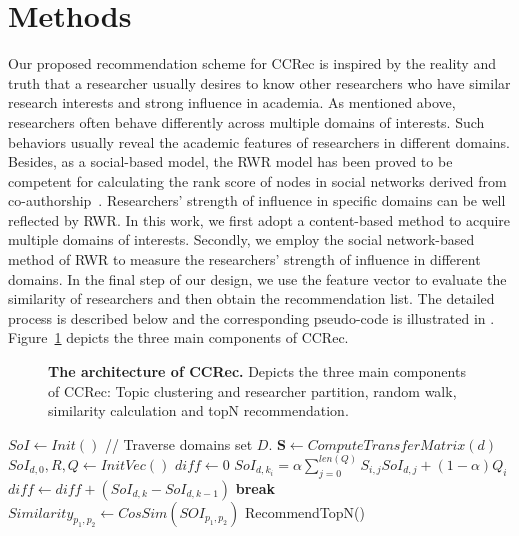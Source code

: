 \documentclass[10pt,letterpaper]{article}
\newcommand{\algorithmicbreak}{\textbf{break}}
\newcommand{\BREAK}{\State \algorithmicbreak}
\begin{document}
\section*{Methods}
Our proposed recommendation scheme for CCRec is inspired by the reality and truth that a researcher usually desires to know other researchers who have similar research interests and strong influence in academia. As mentioned above, researchers often behave differently across multiple domains of interests. Such behaviors usually reveal the academic features of researchers in different domains. Besides, as a social-based model, the RWR model has been proved to be competent for calculating the rank score of nodes in social networks derived from co-authorship~\cite{li2014acrec}. Researchers' strength of influence in specific domains can be well reflected by RWR. In this work, we first adopt a content-based method to acquire multiple domains of interests. Secondly, we employ the social network-based method of RWR to measure the researchers' strength of influence in different domains. In the final step of our design, we use the feature vector to evaluate the similarity of researchers and then obtain the recommendation list. The detailed process is described below and the corresponding pseudo-code is illustrated in . Figure~\ref{Fig. 1} depicts the three main components of CCRec.

\begin{figure}[!hbt]
\caption{{\bf The architecture of CCRec.} Depicts the three main components of CCRec: Topic clustering and researcher partition, random walk, similarity calculation and topN recommendation.}
\label{Fig. 1}
\end{figure}

\begin{algorithm}[!hbt]
  \label{Algorithm1}
  \begin{algorithmic}[1]
  \State $SoI \leftarrow Init()$
   // Traverse domains set $D$.
        \State $\mathbf{S} \leftarrow ComputeTransferMatrix(d)$
        \State $SoI_{d,0}, R, Q \leftarrow InitVec()$
            \State $diff \leftarrow 0$
                \State $SoI_{d,k_{i}} = \alpha\sum_{j=0}^{len(Q)} S_{i,j}SoI_{d,j}+(1-\alpha) Q_{i}$
                \State $diff \leftarrow diff +(SoI_{d,k}-SoI_{d,k-1})$
            \EndFor
                \BREAK
            \EndIf
        \EndFor
  \EndFor
            \State $Similarity_{p_{1},p_{2}} \leftarrow CosSim(SOI_{p_{1},p_{2}})$
        \EndFor
  \EndFor
  \State RecommendTopN()
  \end{algorithmic}
\end{algorithm}
\end{document}
